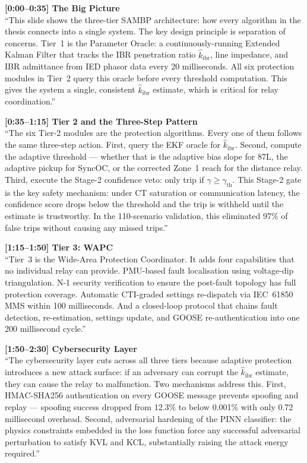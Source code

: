 \documentclass[12pt,a4paper]{article}
\newcommand{\kibrhat}{\hat{k}_\mathrm{ibr}}
\begin{document}
\begin{speakbox}
\textbf{[0:00--0:35] The Big Picture}\\
``This slide shows the three-tier SAMBP architecture: how every algorithm in the
thesis connects into a single system.  The key design principle is separation of
concerns.  Tier~1 is the Parameter Oracle: a continuously-running Extended Kalman
Filter that tracks the IBR penetration ratio $\kibrhat$, line impedance, and IBR
admittance from IED phasor data every 20 milliseconds.  All six protection modules
in Tier~2 query this oracle before every threshold computation.  This gives the
system a single, consistent $\kibrhat$ estimate, which is critical for relay
coordination.''

\medskip
\textbf{[0:35--1:15] Tier 2 and the Three-Step Pattern}\\
``The six Tier-2 modules are the protection algorithms.  Every one of them follows
the same three-step action.  First, query the EKF oracle for $\kibrhat$.  Second,
compute the adaptive threshold --- whether that is the adaptive bias slope for 87L,
the adaptive pickup for SyncOC, or the corrected Zone~1 reach for the distance relay.
Third, execute the Stage-2 confidence veto: only trip if $\gamma \geq \gamma_\mathrm{th}$.
This Stage-2 gate is the key safety mechanism: under CT saturation or communication
latency, the confidence score drops below the threshold and the trip is withheld
until the estimate is trustworthy.  In the 110-scenario validation, this eliminated
97\% of false trips without causing any missed trips.''

\medskip
\textbf{[1:15--1:50] Tier 3: WAPC}\\
``Tier~3 is the Wide-Area Protection Coordinator.  It adds four capabilities that
no individual relay can provide.  PMU-based fault localisation using voltage-dip
triangulation.  N-1 security verification to ensure the post-fault topology has
full protection coverage.  Automatic CTI-graded settings re-dispatch via IEC~61850
MMS within 100 milliseconds.  And a closed-loop protocol that chains fault detection,
re-estimation, settings update, and GOOSE re-authentication into one 200 millisecond
cycle.''

\medskip
\textbf{[1:50--2:30] Cybersecurity Layer}\\
``The cybersecurity layer cuts across all three tiers because adaptive protection
introduces a new attack surface: if an adversary can corrupt the $\kibrhat$ estimate,
they can cause the relay to malfunction.  Two mechanisms address this.  First,
HMAC-SHA256 authentication on every GOOSE message prevents spoofing and replay ---
spoofing success dropped from 12.3\% to below 0.001\% with only 0.72 millisecond
overhead.  Second, adversarial hardening of the PINN classifier: the physics
constraints embedded in the loss function force any successful adversarial perturbation
to satisfy KVL and KCL, substantially raising the attack energy required.''


\end{speakbox}
\end{document}
